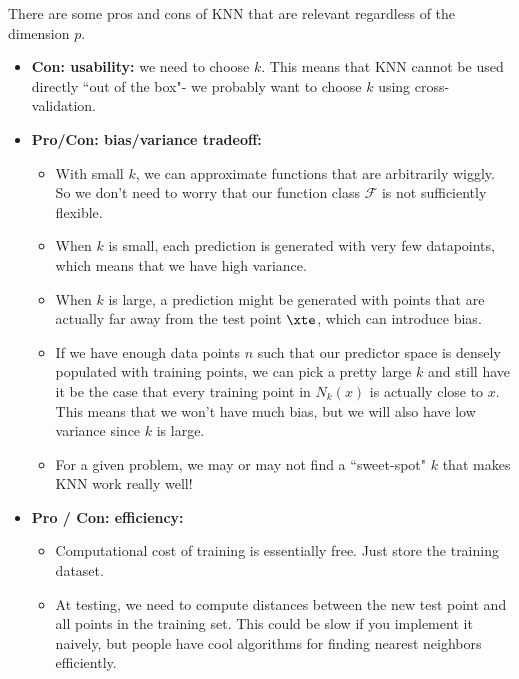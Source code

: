 There are some pros and cons of KNN that are relevant regardless of the dimension $p$. 
\begin{itemize}
	\item \textbf{Con: usability:} we need to choose $k$. This means that KNN cannot be used directly ``out of the box"- we probably want to choose $k$ using cross-validation. 
	\item \textbf{Pro/Con: bias/variance tradeoff: }
	\begin{itemize}
	\item With small $k$, we can approximate functions that are arbitrarily wiggly. So we don't need to worry that our function class $\mathcal{F}$ is not sufficiently flexible. 
	\item When $k$ is small, each prediction is generated with very few datapoints, which means that we have high variance. 
	\item When $k$ is large, a prediction might be generated with points that are actually far away from the test point $\xte$, which can introduce bias. 
	\item If we have enough data points $n$ such that our predictor space is densely populated with training points, we can pick a pretty large $k$ and still have it be the case that every training point in $N_k(x)$ is actually close to $x$. This means that we won't have much bias, but we will also have low variance since $k$ is large.
	\item For a given problem, we may or may not find a ``sweet-spot" $k$ that makes KNN work really well!
	\end{itemize}
	\item \textbf{Pro / Con: efficiency:} 
	\begin{itemize}
	\item Computational cost of training is essentially free. Just store the training dataset. 
	\item At testing, we need to compute distances between the new test point and all points in the training set. This could be slow if you implement it naively, but people have cool algorithms for finding nearest neighbors efficiently. 
	\end{itemize}
\end{itemize}

